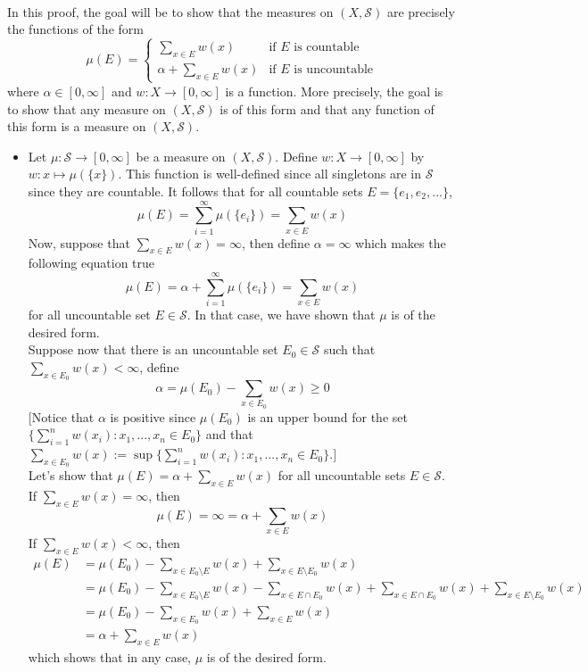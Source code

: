 \begin{solution}
    \\ In this proof, the goal will be to show that the measures on $(X, \mathcal{S})$ are precisely the functions of the form
    $$\mu(E) = \begin{cases}
        \sum_{x \in E}w(x) & \text{if } E \text{ is countable} \\
        \alpha + \sum_{x \in E}w(x) & \text{if } E \text{ is uncountable}
    \end{cases}$$
    where $\alpha \in [0, \infty]$ and $w: X \to [0, \infty]$ is a function. More precisely, the goal is to show that any measure on $(X, \mathcal{S})$ is of this form and that any function of this form is a measure on $(X, \mathcal{S})$. 
    \begin{itemize}
        \item Let $\mu : \mathcal{S} \to [0, \infty]$ be a measure on $(X, \mathcal{S})$. Define $w : X \to [0, \infty]$ by $w : x \mapsto \mu(\{x\})$. This function is well-defined since all singletons are in $\mathcal{S}$ since they are countable. It follows that for all countable sets $E = \{e_1, e_2, ... \}$,
        $$\mu(E) = \sum_{i=1}^{\infty}\mu(\{e_i\}) = \sum_{x \in E}w(x)$$
        Now, suppose that $\sum_{x \in E}w(x) = \infty$, then define $\alpha = \infty$ which makes the following equation true
        $$\mu(E) = \alpha + \sum_{i=1}^{\infty}\mu(\{e_i\}) = \sum_{x \in E}w(x)$$
        for all uncountable set $E \in \mathcal{S}$. In that case, we have shown that $\mu$ is of the desired form. \\ Suppose now that there is an uncountable set $E_0 \in \mathcal{S}$ such that $\sum_{x \in E_0}w(x) < \infty$, define 
        $$\alpha = \mu(E_0) - \sum_{x \in E_0}w(x) \geq 0$$
        $[$Notice that $\alpha$ is positive since $\mu(E_0)$ is an upper bound for the set $\{\sum_{i=1}^{n}w(x_i) : x_1, ..., x_n \in E_0\}$ and that $\sum_{x \in E_0}w(x) := \sup \{\sum_{i=1}^{n}w(x_i) : x_1, ..., x_n \in E_0\}$.$]$ \\
        Let's show that $\mu(E) = \alpha + \sum_{x \in E}w(x)$ for all uncountable sets $E \in \mathcal{S}$. If $\sum_{x \in E}w(x) = \infty$, then
        $$\mu(E) = \infty = \alpha + \sum_{x \in E}w(x)$$
        If $\sum_{x \in E}w(x) < \infty$, then
        \begin{align*}
            \mu(E) &= \mu(E_0) - \sum_{x \in E_0 \setminus E}w(x) + \sum_{x \in E \setminus E_0}w(x) \\
            &= \mu(E_0) - \sum_{x \in E_0 \setminus E}w(x) - \sum_{x \in E \cap E_0}w(x) + \sum_{x \in E \cap E_0}w(x) + \sum_{x \in E \setminus E_0}w(x) \\
            &= \mu(E_0) - \sum_{x \in E_0}w(x) + \sum_{x \in E}w(x) \\
            &= \alpha + \sum_{x \in E}w(x)
        \end{align*}
        which shows that in any case, $\mu$ is of the desired form.


\end{itemize}
\end{solution}
